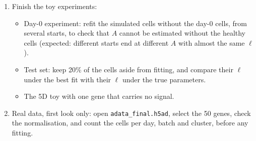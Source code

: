 \documentclass[10pt,a4paper]{article}
\begin{document}
\begin{enumerate}
  \item Finish the toy experiments:
  \begin{itemize}
    \item Day-0 experiment: refit the simulated cells without the day-0 cells, from several starts, to check that $A$ cannot be estimated without the healthy cells (expected: different starts end at different $A$ with almost the same $\ell$).
    \item Test set: keep 20\% of the cells aside from fitting, and compare their $\ell$ under the best fit with their $\ell$ under the true parameters.
    \item The 5D toy with one gene that carries no signal.
  \end{itemize}
  \item Real data, first look only: open \texttt{adata\_final.h5ad}, select the 50 genes, check the normalisation, and count the cells per day, batch and cluster, before any fitting.
\end{enumerate}
\end{document}
